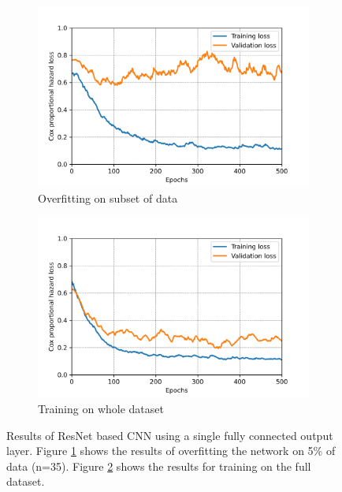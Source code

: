 \begin{figure}[h!t]
    \centering
     \begin{subfigure}[b]{0.495\textwidth}
         \centering
         \includegraphics[width=\textwidth]{latex/loss_plots/!!!_overfit0.05.png}
         \caption{Overfitting on subset of data}
         \label{fig:1fc_overfit}
     \end{subfigure}
    \hfill
     \begin{subfigure}[b]{0.495\textwidth}
         \centering
         \includegraphics[width=\textwidth]{latex/loss_plots/!!!_2023-04-03.png}
         \caption{Training on whole dataset}
         \label{fig:1fc_normal}
     \end{subfigure}
    \hfill
    \caption[CNN with Single-Layer Prediction]{Results of ResNet based CNN using a single fully connected output layer. Figure \ref{fig:1fc_overfit} shows the results of overfitting the network on 5\% of data (n=35). Figure \ref{fig:1fc_normal} shows the results for training on the full dataset.}
    \label{fig:1FCmodel}
\end{figure}

